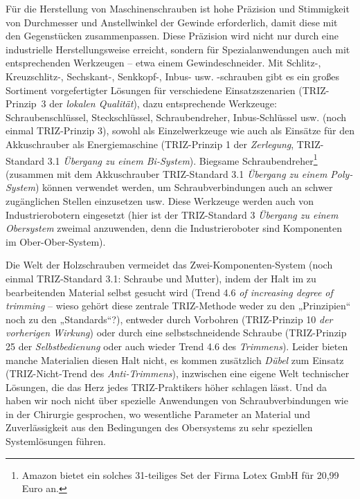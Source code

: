 \documentclass[11pt,a4paper]{article}
\begin{document}
Für die Herstellung von Maschinenschrauben ist hohe Präzision und Stimmigkeit
von Durchmesser und Anstellwinkel der Gewinde erforderlich, damit diese mit
den Gegenstücken zusammenpassen.  Diese Präzision wird nicht nur durch eine
industrielle Herstellungsweise erreicht, sondern für Spezialanwendungen auch
mit entsprechenden Werkzeugen -- etwa einem Gewindeschneider.  Mit Schlitz-,
Kreuzschlitz-, Sechskant-, Senkkopf-, Inbus- usw. -schrauben gibt es ein
großes Sortiment vorgefertigter Lösungen für verschiedene Einsatzszenarien
(TRIZ-Prinzip~3 der \emph{lokalen Qualität}), dazu entsprechende Werkzeuge:
Schraubenschlüssel, Steckschlüssel, Schraubendreher, Inbus-Schlüssel
usw. (noch einmal TRIZ-Prinzip 3), sowohl als Einzelwerkzeuge wie auch als
Einsätze für den Akkuschrauber als Energiemaschine (TRIZ-Prinzip 1 der
\emph{Zerlegung}, TRIZ-Standard 3.1 \emph{Übergang zu einem Bi-System}).
Biegsame Schraubendreher\footnote{Amazon bietet ein solches 31-teiliges Set
  der Firma Lotex GmbH für 20,99 Euro an.} (zusammen mit dem Akkuschrauber
TRIZ-Standard 3.1 \emph{Übergang zu einem Poly-System}) können verwendet
werden, um Schraubverbindungen auch an schwer zugänglichen Stellen einzusetzen
usw.  Diese Werkzeuge werden auch von Industrierobotern eingesetzt (hier ist
der TRIZ-Standard 3 \emph{Übergang zu einem Obersystem} zweimal anzuwenden,
denn die Industrieroboter sind Komponenten im Ober-Ober-System).

Die Welt der Holzschrauben vermeidet das Zwei-Komponenten-System (noch einmal
TRIZ-Standard 3.1: Schraube und Mutter), indem der Halt im zu bearbeitenden
Material selbst gesucht wird (Trend 4.6 \emph{of increasing degree of
  trimming} -- wieso gehört diese zentrale TRIZ-Methode weder zu den
„Prinzipien“ noch zu den „Standards“?), entweder durch Vorbohren (TRIZ-Prinzip
10 \emph{der vorherigen Wirkung}) oder durch eine selbstschneidende Schraube
(TRIZ-Prinzip 25 der \emph{Selbstbedienung} oder auch wieder Trend 4.6 des
\emph{Trimmens}). Leider bieten manche Materialien diesen Halt nicht, es
kommen zusätzlich \emph{Dübel} zum Einsatz (TRIZ-Nicht-Trend des
\emph{Anti-Trimmens}), inzwischen eine eigene Welt technischer Lösungen, die
das Herz jedes TRIZ-Praktikers höher schlagen lässt.  Und da haben wir noch
nicht über spezielle Anwendungen von Schraubverbindungen wie in der Chirurgie
gesprochen, wo wesentliche Parameter an Material und Zuverlässigkeit aus den
Bedingungen des Obersystems zu sehr speziellen Systemlösungen führen.
\end{document}
